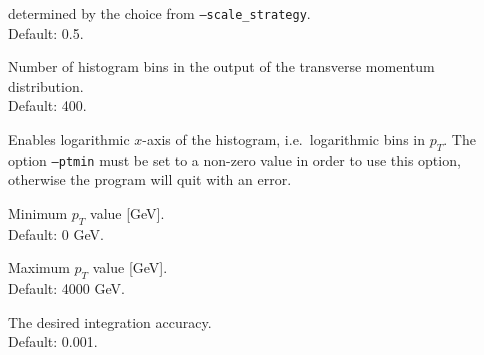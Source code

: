 \documentclass[12pt]{article}
\begin{document}
\begin{description}[labelindent=\parindent, labelwidth =\widthof{\bfseries9999999999999999999999}, leftmargin = !]
        determined by the choice from \texttt{--scale\_strategy}. \\
        Default: 0.5.
      \item[\texttt{--nbins <value>}] Number of histogram bins in the
        output of the transverse momentum distribution. \\ Default:
        400.
      \item[\texttt{--log}] Enables logarithmic $x$-axis of the
        histogram, i.e.\ logarithmic bins in $p_{T}$. The option
        \texttt{--ptmin} must be set to a non-zero value in order to
        use this option, otherwise the program will quit with an
        error.
	\item[\texttt{--ptmin <value>}] Minimum $p_{T}$ value [GeV]. \\ Default: 0 GeV. 
	\item[\texttt{--ptmax <value>}] Maximum $p_{T}$ value [GeV]. \\ Default: 4000 GeV. 
	\item[\texttt{--accuracy <value>}] The desired integration accuracy. \\ Default: 0.001. 
\end{description}
\end{document}
